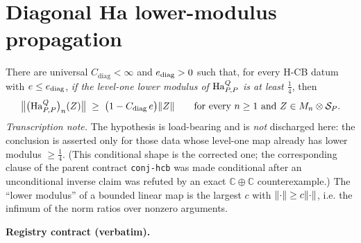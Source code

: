 \section{Diagonal Ha lower-modulus propagation}\label{sec:hcb3-diagonal-lower-modulus}

\begin{lemma}\label{lem:hcb3-diagonal-lower-modulus}
There are universal $C_{\mathrm{diag}}<\infty$ and $e_{\mathrm{diag}}>0$ such that,
for every H-CB datum with $e\le e_{\mathrm{diag}}$, \emph{if the level-one lower
modulus of $\mathrm{Ha}^{Q}_{P,P}$ is at least $\tfrac14$}, then
\begin{equation}\label{eq:dlm-main}
  \bigl\lVert\bigl(\mathrm{Ha}^{Q}_{P,P}\bigr)_{n}(Z)\bigr\rVert\;\ge\;\bigl(1-C_{\mathrm{diag}}\,e\bigr)\lVert Z\rVert
  \qquad\text{for every }n\ge1\text{ and }Z\in M_{n}\otimes \mathcal S_{P} .
\end{equation}
\emph{Transcription note.} The hypothesis is load-bearing and is \emph{not} discharged
here: the conclusion is asserted only for those data whose level-one map already has lower
modulus $\ge\tfrac14$. (This conditional shape is the corrected one; the corresponding
clause of the parent contract \texttt{conj-hcb} was made conditional after an
unconditional inverse claim was refuted by an exact $\mathbb C\oplus\mathbb C$
counterexample.) The ``lower modulus'' of a bounded linear map is the largest $c$ with
$\lVert \cdot\rVert\ge c\lVert \cdot\rVert$, i.e. the infimum of the norm ratios over nonzero arguments.
\end{lemma}

\noindent\textbf{Registry contract (verbatim).}

